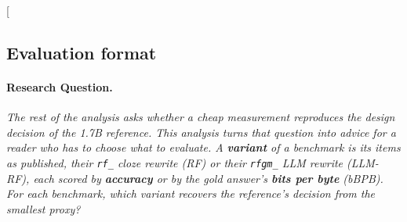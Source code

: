 \clearpage
\twocolumn[{%
\rqparent
\subsection{Evaluation format}
\label{app:rq11_evaluation_recipe}

\noindent\begin{minipage}[t]{0.485\textwidth}
\vspace{0pt}
\paragraph{Research Question.} \emph{The rest of the analysis asks whether a cheap measurement reproduces the design decision of the 1.7B reference. This analysis turns that question into advice for a reader who has to choose what to evaluate. A \textbf{variant} of a benchmark is its items as published, their \texttt{rf\_} cloze rewrite (RF) or their \texttt{rfgm\_} LLM rewrite (LLM-RF), each scored by \textbf{accuracy} or by the gold answer's \textbf{bits per byte} (bBPB). For each benchmark, which variant recovers the reference's decision from the smallest proxy?}


\end{minipage}}
